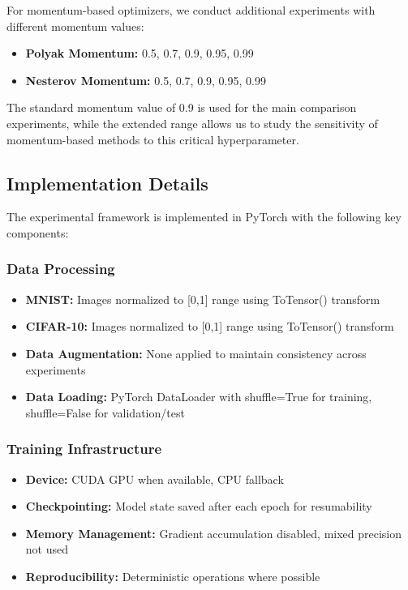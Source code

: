 \documentclass[12pt]{article}
\begin{document}
For momentum-based optimizers, we conduct additional experiments with different momentum values:
\begin{itemize}
    \item \textbf{Polyak Momentum:} 0.5, 0.7, 0.9, 0.95, 0.99
    \item \textbf{Nesterov Momentum:} 0.5, 0.7, 0.9, 0.95, 0.99
\end{itemize}

The standard momentum value of 0.9 is used for the main comparison experiments, while the extended range allows us to study the sensitivity of momentum-based methods to this critical hyperparameter.

\subsection{Implementation Details}

The experimental framework is implemented in PyTorch with the following key components:

\subsubsection{Data Processing}
\begin{itemize}
    \item \textbf{MNIST:} Images normalized to [0,1] range using ToTensor() transform
    \item \textbf{CIFAR-10:} Images normalized to [0,1] range using ToTensor() transform
    \item \textbf{Data Augmentation:} None applied to maintain consistency across experiments
    \item \textbf{Data Loading:} PyTorch DataLoader with shuffle=True for training, shuffle=False for validation/test
\end{itemize}

\subsubsection{Training Infrastructure}
\begin{itemize}
    \item \textbf{Device:} CUDA GPU when available, CPU fallback
    \item \textbf{Checkpointing:} Model state saved after each epoch for resumability
    \item \textbf{Memory Management:} Gradient accumulation disabled, mixed precision not used
    \item \textbf{Reproducibility:} Deterministic operations where possible
\end{itemize}
\end{document}
